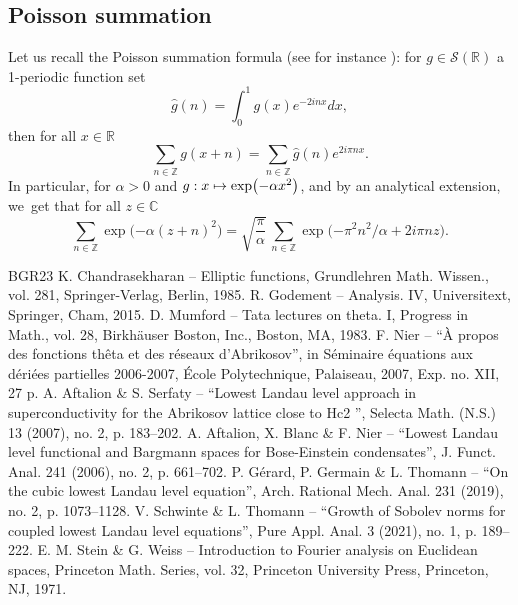 \documentclass[10pt]{amsart}
\newcommand\mto{\mathchoice{\longmapsto}{\mapsto}{\mapsto}{\mapsto}}
\theoremstyle{definition}
\let\EE\exp
\newcommand\C{\mathbb C}
\newcommand\R{\mathbb R}
\newcommand\Z{\mathbb Z}
\begin{document}
\subsection{Poisson summation}
Let us recall the Poisson summation formula (see for instance \cite[Chap.\,VII]{SteinWeiss}): for $g \in \mathscr{S}(\R)$ a 1-periodic function set
\[
\hat{g}(n)=\int_0^1g(x)e^{-2inx}dx,
\]
then for all $ x \in \R$
\begin{equation}\label{PF}
\sum_{n \in \Z}g(x+n)=\sum_{n \in \Z}\hat{g}(n)e^{2i \pi n x}.
\end{equation}
In particular, for $\alpha >0$ and $g: x \mto \EE\bigl({-\alpha x^2}\bigr)$, and by an analytical extension, we~get that for all $z \in \C$
\begin{equation}\label{PF1}
\sum_{n \in \Z} \EE\bigl({-\alpha (z+n)^2}\bigr) =\sqrt{\frac{\pi}{\alpha}}\, \sum_{n \in \Z} \EE\bigl({-{\pi^2 n^2 }/{\alpha}+2 i \pi n z}\bigr).
\end{equation}
\begin{thebibliography}{BGR23}
 K. Chandrasekharan – Elliptic functions, Grundlehren Math. Wissen., vol. 281, Springer-Verlag, Berlin, 1985.
 R. Godement – Analysis. IV, Universitext, Springer, Cham, 2015.
 D. Mumford – Tata lectures on theta. I, Progress in Math., vol. 28, Birkhäuser Boston, Inc., Boston, MA, 1983.
 F. Nier – “À propos des fonctions thêta et des réseaux d’Abrikosov”, in Séminaire équations aux dériées partielles 2006-2007, École Polytechnique, Palaiseau, 2007, Exp. no. XII, 27 p.
 A. Aftalion \& S. Serfaty – “Lowest Landau level approach in superconductivity for the Abrikosov lattice close to Hc2 ”, Selecta Math. (N.S.) 13 (2007), no. 2, p. 183–202.
 A. Aftalion, X. Blanc \& F. Nier – “Lowest Landau level functional and Bargmann spaces for Bose-Einstein condensates”, J. Funct. Anal. 241 (2006), no. 2, p. 661–702.
 P. Gérard, P. Germain \& L. Thomann – “On the cubic lowest Landau level equation”, Arch. Rational Mech. Anal. 231 (2019), no. 2, p. 1073–1128.
 V. Schwinte \& L. Thomann – “Growth of Sobolev norms for coupled lowest Landau level equations”, Pure Appl. Anal. 3 (2021), no. 1, p. 189–222.
 E. M. Stein \& G. Weiss – Introduction to Fourier analysis on Euclidean spaces, Princeton Math. Series, vol. 32, Princeton University Press, Princeton, NJ, 1971.
\end{thebibliography}
\end{document}
